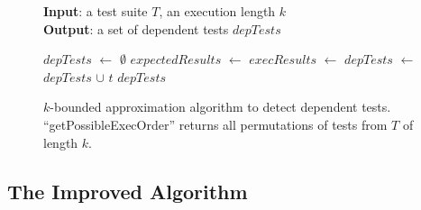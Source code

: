 \begin{figure}[t]
\textbf{Input}: a test suite $\mathit{T}$, an execution length $\mathit{k}$\\
\textbf{Output}: a set of dependent tests $\mathit{depTests}$\\
\vspace{-5mm}
\begin{algorithmic}[1]
\STATE $\mathit{depTests}$ $\leftarrow$ $\emptyset$
\STATE $\mathit{expectedResults}$ $\leftarrow$
\STATE $\mathit{execResults}$ $\leftarrow$
\executeTestsInOrder{\testlist}
\STATE $\mathit{depTests}$ $\leftarrow$ $\mathit{depTests}$ $\cup$ $\mathit{t}$
\ENDIF
\ENDFOR
\ENDFOR
\RETURN $\mathit{depTests}$
\end{algorithmic}
\vspace{-3mm}
\caption{$k$-bounded approximation algorithm to detect dependent
tests. 
``getPossibleExecOrder'' returns all permutations of tests from $T$ of length $k$. 
} 
\label{fig:dtalgorithm}
\end{figure}


\subsection{The Improved Algorithm}
\label{sec:advalgorithm}

